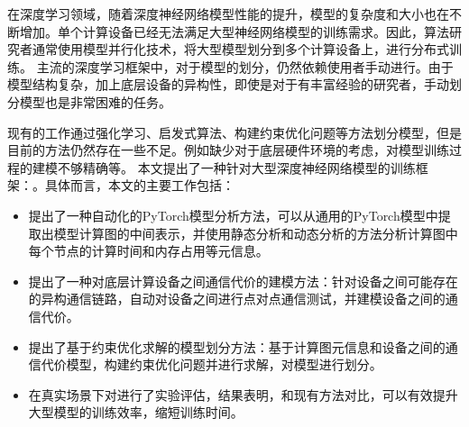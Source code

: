 在深度学习领域，随着深度神经网络模型性能的提升，模型的复杂度和大小也在不断增加。单个计算设备已经无法满足大型神经网络模型的训练需求。因此，算法研究者通常使用模型并行化技术，将大型模型划分到多个计算设备上，进行分布式训练。
主流的深度学习框架中，对于模型的划分，仍然依赖使用者手动进行。由于模型结构复杂，加上底层设备的异构性，即使是对于有丰富经验的研究者，手动划分模型也是非常困难的任务。

现有的工作通过强化学习、启发式算法、构建约束优化问题等方法划分模型，但是目前的方法仍然存在一些不足。例如缺少对于底层硬件环境的考虑，对模型训练过程的建模不够精确等。
本文提出了一种针对大型深度神经网络模型的训练框架：\sys{}。具体而言，本文的主要工作包括：
\begin{itemize}
	\item 提出了一种自动化的PyTorch模型分析方法，可以从通用的PyTorch模型中提取出模型计算图的中间表示，并使用静态分析和动态分析的方法分析计算图中每个节点的计算时间和内存占用等元信息。
	\item 提出了一种对底层计算设备之间通信代价的建模方法：针对设备之间可能存在的异构通信链路，自动对设备之间进行点对点通信测试，并建模设备之间的通信代价。
	\item 提出了基于约束优化求解的模型划分方法：基于计算图元信息和设备之间的通信代价模型，构建约束优化问题并进行求解，对模型进行划分。
	\item 在真实场景下对\sys{}进行了实验评估，结果表明，和现有方法对比，\sys{}可以有效提升大型模型的训练效率，缩短训练时间。
\end{itemize}
